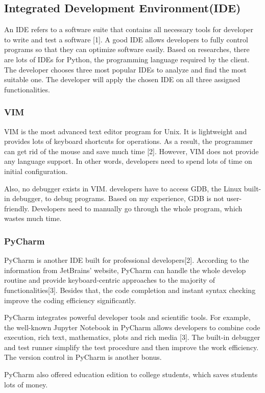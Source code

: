 \documentclass [10pt]{article}
\begin{document}
\subsection{Integrated Development Environment(IDE)}
An IDE refers to a software suite that contains all necessary tools for developer to write and test a software [1]. A good IDE allows developers to fully control programs so that they can optimize software easily. Based on researches, there are lots of IDEs for Python, the programming language required by the client. The developer chooses three most popular IDEs to analyze and find the most suitable one. The developer will apply the chosen IDE on all three assigned functionalities.

\subsubsection{VIM}
VIM is the most advanced text editor program for Unix. It is lightweight and provides lots of keyboard shortcuts for operations. As a result, the programmer can get rid of the mouse and save much time [2]. However, VIM does not provide any language support. In other words, developers need to spend lots of time on initial configuration.  \par
Also, no debugger exists in VIM. developers have to access GDB, the Linux built-in debugger, to debug programs. Based on my experience, GDB is not user-friendly. Developers need to manually go through the whole program, which wastes much time. 
\subsubsection{PyCharm}
PyCharm is another IDE built for professional developers[2]. According to the information from JetBrains’ website, PyCharm can handle the whole develop routine and provide keyboard-centric approaches to the majority of functionalities[3]. Besides that, the code completion and instant syntax checking improve the coding efficiency significantly.  \par
PyCharm integrates powerful developer tools and scientific tools. For example, the well-known Jupyter Notebook in PyCharm allows developers to combine code execution, rich text, mathematics, plots and rich media [3]. The built-in debugger and test runner simplify the test procedure and then improve the work efficiency. The version control in PyCharm is another bonus. \par 
PyCharm also offered education edition to college students, which saves students lots of money. 
\end{document}
